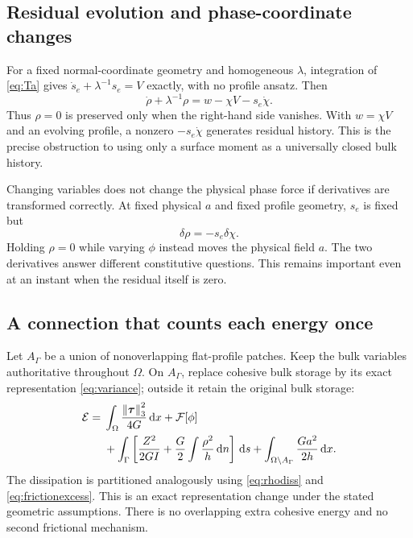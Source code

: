 \documentclass[11pt,a4paper]{article}
\numberwithin{equation}{section}
\newcommand{\dd}{\,\mathrm d}
\newcommand{\ta}{\bm\tau}
\newcommand{\calE}{\mathcal E}
\newcommand{\F}{\mathcal F}
\newcommand{\norm}[1]{\left\lVert#1\right\rVert}
\begin{document}
\subsection{Residual evolution and phase-coordinate changes}

For a fixed normal-coordinate geometry and homogeneous $\lambda$,
integration of \eqref{eq:Ta} gives
$\dot s_e+\lambda^{-1}s_e=V$ exactly, with no profile ansatz.
Then
\begin{equation}
 \boxed{\dot\rho+\lambda^{-1}\rho
       =w-\chi V-s_e\dot\chi.}
 \label{eq:rhoevolution}
\end{equation}
Thus $\rho=0$ is preserved only when the right-hand side vanishes.
With $w=\chi V$ and an evolving profile, a nonzero
$-s_e\dot\chi$ generates residual history. This is the precise obstruction to
using only a surface moment as a universally closed bulk history.

Changing variables does not change the physical phase force if derivatives
are transformed correctly. At fixed physical $a$ and fixed profile geometry,
$s_e$ is fixed but
\begin{equation}
 \delta\rho=-s_e\delta\chi.
 \label{eq:coordinatephase}
\end{equation}
Holding $\rho=0$ while varying $\phi$ instead moves the physical field $a$.
The two derivatives answer different constitutive questions.
This remains important even at an instant when the residual itself is zero.

\subsection{A connection that counts each energy once}

Let $A_\Gamma$ be a union of nonoverlapping flat-profile patches.
Keep the bulk variables authoritative throughout $\Omega$.
On $A_\Gamma$, replace cohesive bulk storage by its exact representation
\eqref{eq:variance}; outside it retain the original bulk storage:
\begin{align}
 \calE={}&\int_\Omega\frac{\norm{\ta}_3^2}{4G}\dd x+\F[\phi]\notag\\
 &+\int_\Gamma\left[
       \frac{Z^2}{2GI}+\frac G2\int\frac{\rho^2}{h}\dd n
      \right]\dd s
   +\int_{\Omega\setminus A_\Gamma}\frac{Ga^2}{2h}\dd x .
 \label{eq:hybridexact}
\end{align}
The dissipation is partitioned analogously using \eqref{eq:rhodiss}
and \eqref{eq:frictionexcess}. This is an exact representation change under
the stated geometric assumptions. There is no overlapping extra cohesive
energy and no second frictional mechanism.
\end{document}
